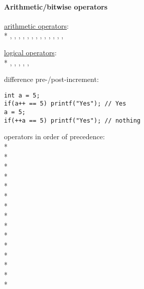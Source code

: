 \paragraph{Arithmetic/bitwise operators}
\begin{items}
  \item \underline{arithmetic operators}: \\*
    , , , , , , , , , , , , , 
  \item \underline{logical operators}: \\*
    , , , , , 
  \item difference pre-/post-increment:
  \begin{lstlisting}[style=customc]
int a = 5;
if(a++ == 5) printf("Yes"); // Yes
a = 5;
if(++a == 5) printf("Yes"); // nothing
  \end{lstlisting}
  \item operators in order of precedence: \\*
     \\*
     \\*
    \code{*, /, \%} \\*
    \code{+, -} \\*
    \code{<<, >>} \\*
    \code{<, <=, >, >=} \\*
    \code{==, !=} \\*
    \code{&} \\*
    \code{^} \\*
    \code{\|} \\*
    \code{&&} \\*
    \code{\|\|} \\*
     \\*
    \code{=, +=, -=, *=, /=, \%=, &=, ~=, |=, <<=, >>=} \\*
    \code{,}
\end{items}

